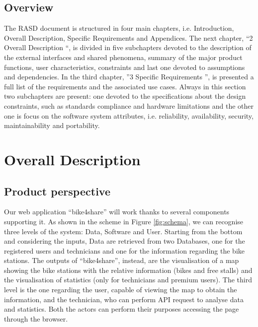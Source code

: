 \documentclass{article}
\begin{document}
\subsection{Overview}
The RASD document is structured in four main chapters, i.e. Introduction, Overall Description, Specific Requirements and Appendices. The next chapter, “2 Overall Description “, is divided in five subchapters devoted to the description of the external interfaces and shared phenomena, summary of the major product functions, user characteristics, constraints and last one devoted to assumptions and dependencies.
In the third chapter, ”3 Specific Requirements ”, is presented a full list of the requirements and the associated use cases. Always in this section two subchapters are present: one devoted to the specifications about the design constraints, such as standards compliance and hardware limitations and the other one is focus on the software system attributes, i.e. reliability, availability, security, maintainability and portability.

\section{Overall Description}
\subsection{Product perspective}
Our web application “bike4share” will work thanks to several components supporting it. As shown in the scheme in Figure \ref{fig:schema}, we can recognise three levels of the system: Data, Software and User. 
Starting from the bottom and considering the inputs, Data are retrieved from two Databases, one for the registered users and technicians and one for the information regarding the bike stations. 
The outputs of “bike4share”, instead, are the visualisation of a map showing the bike stations with the relative information (bikes and free stalls) and the visualisation of statistics (only for technicians and premium users). 
The third level is the one regarding the user, capable of viewing the map to obtain the information, and the technician, who can perform API request to analyse data and statistics. Both the actors can perform their purposes accessing the page through the browser. 
\end{document}
